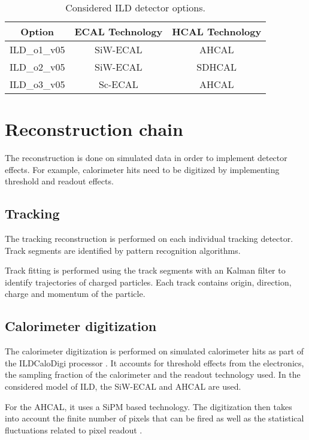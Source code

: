\begin{table}[htb!]
  \centering
  \caption{Considered ILD detector options.} \label{table:ILDOptions}
  \begin{tabular}{|c|c|c|}
    \hline
    Option & ECAL Technology & HCAL Technology \\
    \hline
    ILD\_o1\_v05 & SiW-ECAL & AHCAL \\
    ILD\_o2\_v05 & SiW-ECAL & SDHCAL \\
    ILD\_o3\_v05 & Sc-ECAL & AHCAL \\
    \hline
  \end{tabular}
\end{table}

\section{Reconstruction chain}
\label{sec:recochain}

The reconstruction is done on simulated data in order to implement detector effects. For example, calorimeter hits need to be digitized by implementing threshold and readout effects.

\subsection{Tracking}

The tracking reconstruction is performed on each individual tracking detector. Track segments are identified by pattern recognition algorithms.

Track fitting is performed using the track segments with an Kalman filter \cite{Fruhwirth:1987fm} to identify trajectories of charged particles. Each track contains origin, direction, charge and momentum of the particle.

\subsection{Calorimeter digitization}
\label{subsec:ILDDigiCalo}

The calorimeter digitization is performed on simulated calorimeter hits as part of the ILDCaloDigi processor \cite{Jeans2015}. It accounts for threshold effects from the electronics, the sampling fraction of the calorimeter and the readout technology used. In the considered model of ILD, the SiW-ECAL and AHCAL are used.

For the AHCAL, it uses a SiPM based technology. The digitization then takes into account the finite number of pixels that can be fired as well as the statistical fluctuations related to pixel readout \cite{Hartbrich:2016bbz}.

